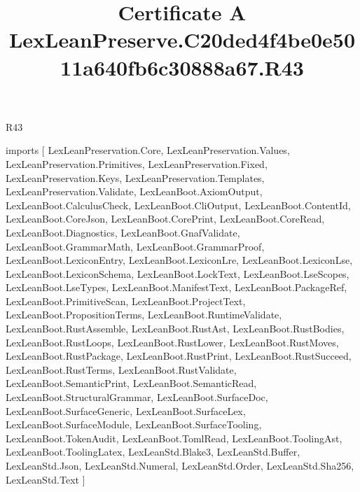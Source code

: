 \begin{lexlean}{R43}
\title{Certificate A LexLeanPreserve.C20ded4f4be0e5011a640fb6c30888a67.R43}
\begin{coremodule}
imports [
  LexLeanPreservation.Core,
  LexLeanPreservation.Values,
  LexLeanPreservation.Primitives,
  LexLeanPreservation.Fixed,
  LexLeanPreservation.Keys,
  LexLeanPreservation.Templates,
  LexLeanPreservation.Validate,
  LexLeanBoot.AxiomOutput,
  LexLeanBoot.CalculusCheck,
  LexLeanBoot.CliOutput,
  LexLeanBoot.ContentId,
  LexLeanBoot.CoreJson,
  LexLeanBoot.CorePrint,
  LexLeanBoot.CoreRead,
  LexLeanBoot.Diagnostics,
  LexLeanBoot.GnafValidate,
  LexLeanBoot.GrammarMath,
  LexLeanBoot.GrammarProof,
  LexLeanBoot.LexiconEntry,
  LexLeanBoot.LexiconLre,
  LexLeanBoot.LexiconLse,
  LexLeanBoot.LexiconSchema,
  LexLeanBoot.LockText,
  LexLeanBoot.LseScopes,
  LexLeanBoot.LseTypes,
  LexLeanBoot.ManifestText,
  LexLeanBoot.PackageRef,
  LexLeanBoot.PrimitiveScan,
  LexLeanBoot.ProjectText,
  LexLeanBoot.PropositionTerms,
  LexLeanBoot.RuntimeValidate,
  LexLeanBoot.RustAssemble,
  LexLeanBoot.RustAst,
  LexLeanBoot.RustBodies,
  LexLeanBoot.RustLoops,
  LexLeanBoot.RustLower,
  LexLeanBoot.RustMoves,
  LexLeanBoot.RustPackage,
  LexLeanBoot.RustPrint,
  LexLeanBoot.RustSucceed,
  LexLeanBoot.RustTerms,
  LexLeanBoot.RustValidate,
  LexLeanBoot.SemanticPrint,
  LexLeanBoot.SemanticRead,
  LexLeanBoot.StructuralGrammar,
  LexLeanBoot.SurfaceDoc,
  LexLeanBoot.SurfaceGeneric,
  LexLeanBoot.SurfaceLex,
  LexLeanBoot.SurfaceModule,
  LexLeanBoot.SurfaceTooling,
  LexLeanBoot.TokenAudit,
  LexLeanBoot.TomlRead,
  LexLeanBoot.ToolingAst,
  LexLeanBoot.ToolingLatex,
  LexLeanStd.Blake3,
  LexLeanStd.Buffer,
  LexLeanStd.Json,
  LexLeanStd.Numeral,
  LexLeanStd.Order,
  LexLeanStd.Sha256,
  LexLeanStd.Text
]


\end{coremodule}
\end{lexlean}
